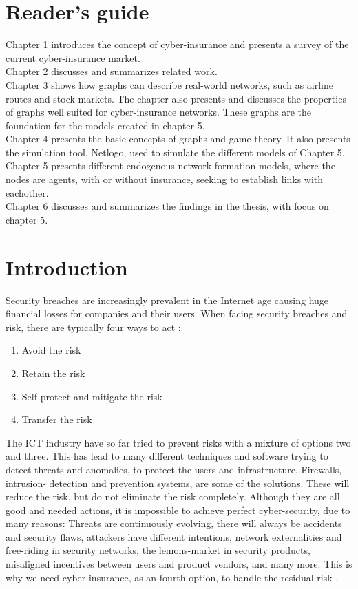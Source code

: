 \section{Reader's guide}
Chapter 1 introduces the concept of cyber-insurance and presents a survey of the current cyber-insurance market. 
\\Chapter 2 discusses and summarizes related work. 
\\Chapter 3 shows how graphs can describe real-world networks, such as airline routes and stock markets. The chapter also presents and discusses the properties of graphs well suited for cyber-insurance networks. These graphs are the foundation for the models created in chapter 5. 
\\Chapter 4 presents the basic concepts of graphs and game theory. It also presents the simulation tool, Netlogo, used to simulate the different models of Chapter 5. 
\\Chapter 5 presents different endogenous network formation models, where the nodes are agents, with or without insurance, seeking to establish links with eachother.  
\\Chapter 6 discusses and summarizes the findings in the thesis, with focus on chapter 5. 


\section{Introduction}
Security breaches are increasingly prevalent in the Internet age causing huge financial losses
for companies and their users. When facing security breaches and risk, there are typically four ways to act \cite{bolot2008new}:
\begin{enumerate}
\item Avoid the risk
\item Retain the risk
\item Self protect and mitigate the risk
\item Transfer the risk
\end{enumerate}
The ICT industry have so far tried to prevent risks with a mixture of options two and three. This has lead to many different techniques and software trying to detect threats and anomalies, to protect the users and infrastructure. Firewalls, intrusion- detection and prevention systems, are some of the solutions. These will reduce the risk, but do not eliminate the risk completely. Although they are all good and needed actions, it is impossible to achieve perfect cyber-security, due to many reasons: Threats are continuously evolving, there will always be accidents and security flaws, attackers have different intentions, network externalities and free-riding in security networks, the lemons-market in security products, misaligned incentives between users and product vendors, and many more. 
This is why we need cyber-insurance, as an fourth option, to handle the residual risk \cite{lelarge2009economic,paldifferentiating}.

